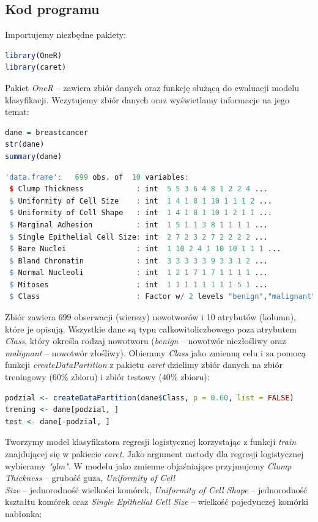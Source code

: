 \documentclass[a4paper]{article}
\begin{document}
\subsection{Kod programu}
Importujemy niezbędne pakiety:
\begin{lstlisting}[language=R, frame=single]
library(OneR)
library(caret)
\end{lstlisting}
Pakiet \textit{OneR} -- zawiera zbiór danych oraz funkcję służącą do ewaluacji modelu klasyfikacji. Wczytujemy zbiór danych oraz wyświetlamy informacje na jego temat:
\begin{lstlisting}[language=R, frame=single]
dane = breastcancer
str(dane)
summary(dane)
\end{lstlisting}
\begin{lstlisting}[language=R, frame=single]
'data.frame':	699 obs. of  10 variables:
 $ Clump Thickness            : int  5 5 3 6 4 8 1 2 2 4 ...
 $ Uniformity of Cell Size    : int  1 4 1 8 1 10 1 1 1 2 ...
 $ Uniformity of Cell Shape   : int  1 4 1 8 1 10 1 2 1 1 ...
 $ Marginal Adhesion          : int  1 5 1 1 3 8 1 1 1 1 ...
 $ Single Epithelial Cell Size: int  2 7 2 3 2 7 2 2 2 2 ...
 $ Bare Nuclei                : int  1 10 2 4 1 10 10 1 1 1 ...
 $ Bland Chromatin            : int  3 3 3 3 3 9 3 3 1 2 ...
 $ Normal Nucleoli            : int  1 2 1 7 1 7 1 1 1 1 ...
 $ Mitoses                    : int  1 1 1 1 1 1 1 1 5 1 ...
 $ Class                      : Factor w/ 2 levels "benign","malignant": 1 1 1 1 1 2 1 1 1
\end{lstlisting}
Zbiór zawiera 699 obserwacji (wierszy) nowotworów i 10 atrybutów (kolumn), które je opisują. Wszystkie dane są typu całkowitoliczbowego poza atrybutem \textit{Class}, który określa rodzaj nowotworu (\textit{benign} -- nowotwór niezłośliwy oraz \textit{malignant} -- nowotwór złośliwy). Obieramy \textit{Class} jako zmienną celu i za pomocą funkcji \textit{createDataPartition} z pakietu \textit{caret} dzielimy zbiór danych na zbiór treningowy ($60\%$ zbioru) i zbiór testowy ($40\% $ zbioru): 
\begin{lstlisting}[language=R, frame=single]
podzial <- createDataPartition(dane$Class, p = 0.60, list = FALSE)
trening <- dane[podzial, ] 
test <- dane[-podzial, ]
\end{lstlisting}
Tworzymy model klasyfikatora regresji logistycznej korzystając z funkcji \textit{train} znajdującej się w pakiecie \textit{caret}. Jako argument metody dla regresji logistycznej wybieramy \textit{"glm"}. W modelu jako zmienne objaśniające przyjmujemy  \textit{Clump  Thickness} -- grubość guza, \textit{Uniformity  of Cell  \\Size} -- jednorodność wielkości komórek, \textit{Uniformity  of Cell  Shape } -- jednorodność kształtu komórek oraz \textit{Single  Epithelial  Cell Size} -- wielkość pojedynczej komórki nabłonka:
\end{document}
